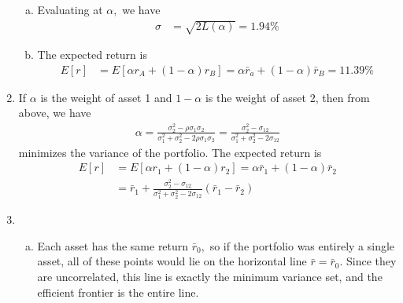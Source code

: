 \documentclass{article}
\begin{document}
\begin{enumerate}
\begin{enumerate}[(a)]
			\item 
				\begin{soln}
					Evaluating at $\alpha,$ we have
					\begin{align*}
						\sigma &= \sqrt{2L(\alpha)} = 1.94\%
					\end{align*}
				\end{soln}

			\item 
				\begin{soln}
					The expected return is
					\begin{align*}
						E[r] &= E[\alpha r_A + (1-\alpha)r_B] = \alpha \bar r_a + (1-\alpha)\bar r_B = 11.39\%
					\end{align*}
				\end{soln}
				
		\end{enumerate}

	\item 
		\begin{soln}
			If $\alpha$ is the weight of asset 1 and $1-\alpha$ is the weight of asset 2, then from above, we have
			\begin{align*}
				\alpha = \frac{\sigma_2^2 - \rho\sigma_1\sigma_2}{\sigma_1^2+\sigma_2^2-2\rho\sigma_1\sigma_2} = \frac{\sigma_2^2 - \sigma_{12}}{\sigma_1^2+\sigma_2^2-2\sigma_{12}}
			\end{align*}
			minimizes the variance of the portfolio. The expected return is
			\begin{align*}
				E[r] &= E[\alpha r_1+(1-\alpha) r_2] = \alpha \bar r_1 + (1-\alpha)\bar r_2 \\
				&= \bar r_1 + \frac{\sigma_2^2-\sigma_{12}}{\sigma_1^2+\sigma_2^2-2\sigma_{12}}(\bar r_1-\bar r_2)
			\end{align*}
		\end{soln}

	\item
		\begin{enumerate}[(a)]
			\item 
				\begin{soln}
					Each asset has the same return $\bar r_0,$ so if the portfolio was entirely a single asset, all of these points would lie on the horizontal line $\bar r = \bar r_0.$ Since they are uncorrelated, this line is exactly the minimum variance set, and the efficient frontier is the entire line.
				\end{soln}


\end{enumerate}
\end{enumerate}
\end{document}
